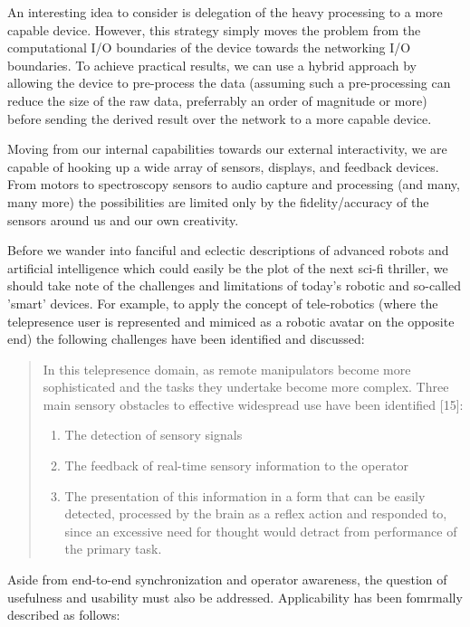 \documentclass[a4paper,12pt]{report}
\begin{document}
An interesting idea to consider is delegation of the heavy processing to a more capable device. However, this strategy simply moves the problem from the computational I/O boundaries of the device towards the networking I/O boundaries. To achieve practical results, we can use a hybrid approach by allowing the device to pre-process the data (assuming such a pre-processing can reduce the size of the raw data, preferrably an order of magnitude or more) before sending the derived result over the network to a more capable device.

Moving from our internal capabilities towards our external interactivity, we are capable of hooking up a wide array of sensors, displays, and feedback devices. From motors to spectroscopy sensors to audio capture and processing (and many, many more) the possibilities are limited only by the fidelity/accuracy of the sensors around us and our own creativity.

Before we wander into fanciful and eclectic descriptions of advanced robots and artificial intelligence which could easily be the plot of the next sci-fi thriller, we should take note of the challenges and limitations of today's robotic and so-called 'smart' devices. For example, to apply the concept of tele-robotics (where the telepresence user is represented and mimiced as a robotic avatar on the opposite end) the following challenges have been identified and discussed:

\begin{quote}
In this telepresence domain, as remote manipulators become more sophisticated and the tasks they undertake become more complex. Three main sensory obstacles to effective widespread use have been identified [15]:
	\begin{enumerate}
		\item The detection of sensory signals
		\item The feedback of real-time sensory information to the operator
		\item The presentation of this information in a form that can be easily detected, processed by the brain as a reflex action and responded to, since an excessive need for thought would detract from performance of the primary task.
	\end{enumerate}
	\begin{flushright}
		\cite{540147}
	\end{flushright}
\end{quote}

Aside from end-to-end synchronization and operator awareness, the question of usefulness and usability must also be addressed. Applicability has been fomrmally described as follows:
\end{document}
